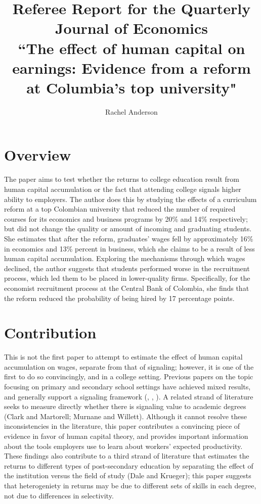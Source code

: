 \documentclass[a4paper, 11pt]{article}
\begin{document}

\title{Referee Report for the Quarterly Journal of Economics \\
\Large ``The effect of human capital on earnings: Evidence from a reform at Columbia's top university"}
\author{Rachel Anderson}
\maketitle

\section*{Overview}

The paper aims to test whether the returns to college education result from human capital accumulation or the fact that attending college signals higher ability to employers.  The author does this by studying the effects of a curriculum reform at a top Colombian university that reduced the number of required courses for its economics and business programs by 20\% and 14\% respectively; but did not change the quality or amount of incoming and graduating students.  She estimates that after the reform, graduates' wages fell by approximately 16\% in economics and 13\% percent in business, which she claims to be a result of less human capital accumulation.  Exploring the mechanisms through which wages declined, the author suggests that students performed worse in the recruitment process, which led them to be placed in lower-quality firms.  Specifically, for the economist recruitment process at the Central Bank of Colombia, she finds that the reform reduced the probability of being hired by 17 percentage points. 

\section*{Contribution}

This is not the first paper to attempt to estimate the effect of human capital accumulation on wages, separate from that of signaling; however, it is one of the first to do so convincingly, and in a college setting.  Previous papers on the topic focusing on primary and secondary school settings have achieved mixed results, and generally support a signaling framework (\cite{hu16}, \cite{bedard01}, \cite{lang86}).  A related strand of literature seeks to measure directly whether there is signaling value to academic degrees (Clark and Martorell; Murnane and Willett).  Although it cannot resolve these inconsistencies in the literature, this paper contributes a convincing piece of evidence in favor of human capital theory, and provides important information about the tools employers use to learn about workers' expected productivity.  These findings also contribute to a third strand of literature that estimates the returns to different types of post-secondary education by separating the effect of the institution versus the field of study (Dale and Krueger); this paper suggests that heterogeniety in returns may be due to different sets of skills in each degree, not due to differences in selectivity.
\end{document}
